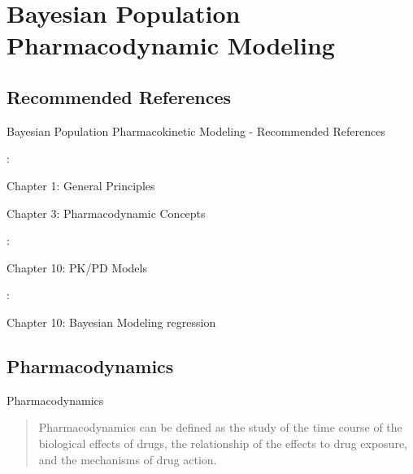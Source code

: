 
\section{Bayesian Population Pharmacodynamic Modeling}

\subsection{Recommended References}
\begin{frame}{Bayesian Population Pharmacokinetic Modeling - Recommended References}
    \begin{vfilleditems}
        \item \textcite{Gabrielsson2006PKPDbook}:
        \begin{vfilleditems}
            \item Chapter 1: General Principles
            \item Chapter 3: Pharmacodynamic Concepts
        \end{vfilleditems}
        \item \textcite{Owen2014PKPDbook}:
        \begin{vfilleditems}
            \item Chapter 10: PK/PD Models
        \end{vfilleditems}
        \item \textcite{Bonate2011PKPDbook}:
        \begin{vfilleditems}
            \item Chapter 10: Bayesian Modeling regression
        \end{vfilleditems}
        \item \textcite{margossian2022torsten}
    \end{vfilleditems}
\end{frame}

\subsection{Pharmacodynamics}
\begin{frame}{Pharmacodynamics}
    \begin{defn}[Pharmacodynamics]
        \begin{quotation}
            Pharmacodynamics can be defined as the study of the time course of the
            biological effects of drugs, the relationship of the effects to drug exposure,
            and the mechanisms of drug action.
        \end{quotation}
        \vfill \vfill
        \textcite[199]{Gabrielsson2006PKPDbook}
    \end{defn}
\end{frame}

